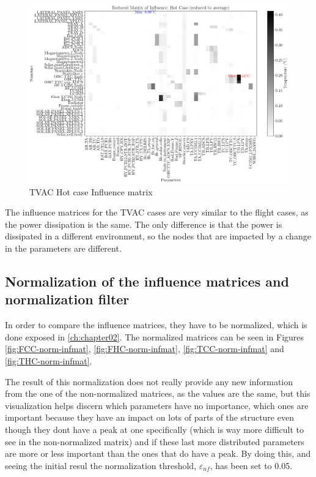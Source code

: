 \begin{figure}[H]
    \centering
    \includegraphics[width = \linewidth]{Figures/UPMSat3/TVAC/infmatHC.png}
    \caption{TVAC Hot case Influence matrix}
    \label{fig:THC-infmat}
\end{figure}

The influence matrices for the TVAC cases are very similar to the flight cases, as the power dissipation is the same. The only difference is that the power is dissipated in a different environment, so the nodes that are impacted by a change in the parameters are different.

\subsection{Normalization of the influence matrices and normalization filter}
In order to compare the influence matrices, they have to be normalized, which is done exposed in \autoref{ch:chapter02}. The normalized matrices can be seen in Figures \ref{fig:FCC-norm-infmat}, \ref{fig:FHC-norm-infmat}, \ref{fig:TCC-norm-infmat} and \ref{fig:THC-norm-infmat}.

The result of this normalization does not really provide any new information from the one of the non-normalized matrices, as the values are the same, but this visualization helps discern which parameters have no importance, which ones are important because they have an impact on lots of parts of the structure even though they dont have a peak at one specifically (which is way more difficult to see in the non-normalized matrix) and if these last more distributed parameters are more or less important than the ones that do have a peak. By doing this, and seeing the initial resul the normalization threshold, $\varepsilon_{nf}$, has been set to 0.05.

